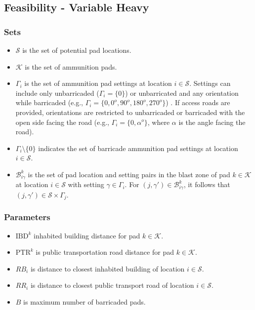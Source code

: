 \documentclass[10pt]{article}
\begin{document}
	\subsection{Feasibility - Variable Heavy}

	\subsubsection{Sets}
	\begin{itemize}
		\item $\mathcal{S}$ is the set of potential pad locations.
		\item $\mathcal{K}$ is the set of ammunition pads.
		\item $\Gamma_i$ is the set of ammunition pad settings at location $ i \in \mathcal{S}$. Settings can include only unbarricaded ($\Gamma_i = \{0\}$) or unbarricated and any orientation while barricaded (e.g., $\Gamma_i = \{0, 0^o, 90^o, 180^o, 270^o\}$) . If access roads are provided, orientations are restricted to unbarricaded or barricaded with the open side facing the road (e.g., $\Gamma_i = \{0, \alpha^o\}$, where $ \alpha $ is the angle facing the road).
		\item $\Gamma_i \setminus \{0\}$ indicates the set of barricade ammunition pad settings at location $i \in \mathcal{S}$.
		\item $ \mathcal{B}_{i\gamma}^{k} $ is the set of pad location and setting pairs in the blast zone of pad $ k \in \mathcal{K}$ at location $ i \in \mathcal{S}$ with setting $ \gamma \in \Gamma_i $. For $ (j, \gamma') \in \mathcal{B}_{i\gamma}^{k} $, it follows that $ (j, \gamma') \in \mathcal{S} \times \Gamma_j $.
	\end{itemize}
	
	\subsubsection{Parameters}
	\begin{itemize}
		\item $\text{IBD}^k$ inhabited building distance for pad $ k \in \mathcal{K}$.
		\item $\text{PTR}^k$ is public transportation road distance for pad $ k \in \mathcal{K}$.
		\item $ RB_i $ is distance to closest inhabited building of location $i \in \mathcal{S}$.
		\item $ RR_i $ is distance to closest public transport road of location $i \in \mathcal{S}$.
		\item $ B $ is maximum number of barricaded pads.
	\end{itemize}
	
\end{document}
